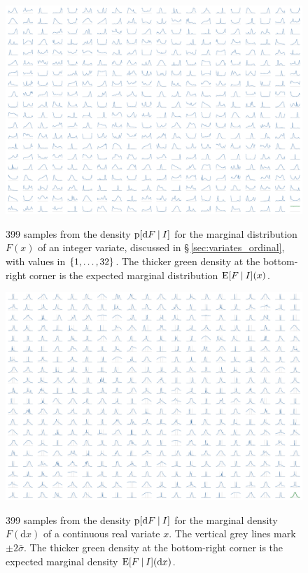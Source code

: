 \documentclass[\ifafour a4paper,12pt,\else a5paper,10pt,\fi%
onecolumn,oneside,article,%
british%
]{memoir}
\theoremstyle{remark}
\theoremstyle{innote}
\newcommand*{\di}{\mathrm{d}}%
\DeclarePairedDelimiter\set{\{}{\}} %
\newcommand*{\p}{\mathrm{p}}%
\newcommand*{\E}{\mathrm{E}}
\renewcommand*{\|}[1][]{\nonscript\:#1\vert\nonscript\:\mathopen{}}
\newcommand*{\sect}{\S}%
\newcommand*{\sigmao}{\bar{\sigma}}
\begin{document}
\begin{figure}
\centering\includegraphics[width=\linewidth]{priorsamples_integer_32.pdf}\\
\caption{399 samples from the density $\p[\di F \| I]$ for the marginal distribution $F(x)$ of an integer variate, discussed in \sect\,\ref{sec:variates_ordinal}, with values in $\set{1,\dotsc,32}$. The thicker green density at the bottom-right corner is the expected marginal distribution $\E[F\| I](x)$.}\label{fig:marginal_integer}
\end{figure}

\begin{figure}
\centering\includegraphics[width=\linewidth]{priorsamples_real.pdf}\\
\caption{399 samples from the density $\p[\di F \| I]$ for the marginal density $F(\di x)$ of a continuous real variate $x$. The vertical grey lines mark $\pm2\sigmao$. The thicker green density at the bottom-right corner is the expected marginal density $\E[F\| I](\di x)$.}\label{fig:marginal_censored}
\end{figure}
\end{document}
